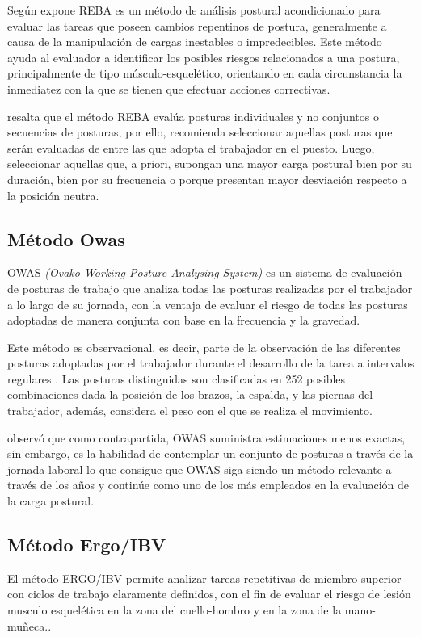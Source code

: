 Según expone \parencite{Hignett2000RapidREBA} REBA es un método de análisis postural acondicionado para evaluar las tareas que poseen cambios repentinos de postura, generalmente a causa de la manipulación de cargas inestables o impredecibles. Este método ayuda al evaluador a identificar los posibles riesgos relacionados a una postura, principalmente de tipo músculo-esquelético, orientando en cada circunstancia la inmediatez con la que se tienen que efectuar acciones correctivas.

\parencite{Diego-Mas2015EvaluacionREBA} resalta que el método REBA evalúa posturas individuales y no conjuntos o secuencias de posturas, por ello, recomienda seleccionar aquellas posturas que serán evaluadas de entre las que adopta el trabajador en el puesto. Luego, seleccionar aquellas que, a priori, supongan una mayor carga postural bien por su duración, bien por su frecuencia o porque presentan mayor desviación respecto a la posición neutra.
\subsection{Método Owas}
OWAS \textit{(Ovako Working Posture Analysing System)} es un sistema de evaluación de posturas de trabajo que analiza todas las posturas realizadas por el trabajador a lo largo de su jornada, con la ventaja de evaluar el riesgo de todas las posturas adoptadas de manera conjunta con base en la frecuencia y la gravedad.\parencite{MattilaMVilkki1999OccupationalSystems}

Este método es observacional, es decir, parte de la observación de las diferentes posturas adoptadas por el trabajador durante el desarrollo de la tarea a intervalos regulares \parencite{Diego-Mas2015EvaluacionOWAS}. Las posturas distinguidas son clasificadas en 252 posibles combinaciones dada la posición de los brazos, la espalda, y las piernas del trabajador, además, considera el peso con el que se realiza el movimiento. 

\parencite{Diego-Mas2015EvaluacionOWAS} observó que como contrapartida, OWAS suministra estimaciones menos exactas, sin embargo, es la habilidad de contemplar un conjunto de posturas a través de la jornada laboral lo que consigue que OWAS siga siendo un método relevante a través de los años y continúe como uno de los más empleados en la evaluación de la carga postural.
\subsection{Método Ergo/IBV}
El método ERGO/IBV permite analizar tareas repetitivas de miembro superior con ciclos de trabajo claramente definidos, con el fin de evaluar el riesgo de lesión musculo esquelética en la zona del cuello-hombro y en la zona de la mano-muñeca.\parencite{Nogareda2009TareasErgonomicos}.

